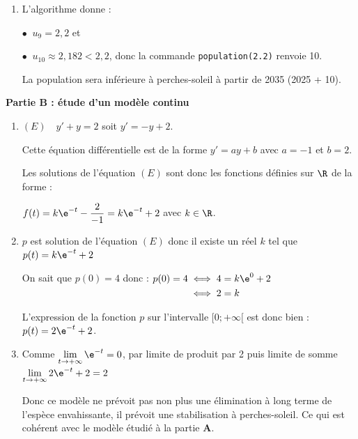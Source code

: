 \begin{enumerate}
\begin{enumerate}
Pour que la boucle \texttt{while} s'arrête dès que $u_n < s$, il faut qu'elle continue tant que cette condition n'est pas réalisée, c'est-à-dire tant que \texttt{u} contient une valeur qui n'est pas strictement inférieure à $s$.

Et tant que c'est le cas, les deux instructions à répéter sont : de remplacer la valeur stockée dans \texttt{u} par la valeur suivante, en appliquant la relation de récurrence, et donc d'augmenter de 1 la valeur de l'indice stocké dans \texttt{n}, pour garder la correspondance.
		\item L'algorithme donne :

$\bullet~$ $u_9 = 2,2$ et 

$\bullet~$ $u_{10} \approx 2,182 <  2,2$, donc la commande \texttt{population(2.2)} renvoie 10.

La population sera inférieure à  perches-soleil à partir de 2035 (2025 + 10).
	\end{enumerate}
	\end{enumerate}

	\textbf{Partie B : étude d'un modèle continu}
	
	\begin{enumerate}
		\item $(E) \quad y'+y=2$ \quad soit \quad $y'=-y+2$.

		Cette équation différentielle est de la forme \quad $y'=ay+b$ \quad avec $a=-1$ et $b=2$.

		Les solutions de l'équation $(E)$ sont donc les fonctions définies sur $\R$ de la forme :

		$f(t) = k \e^{-t} - \dfrac{2}{-1}= k\e^{-t} +2$ \quad avec $k \in \R$.


		\item $p$ est solution de l'équation $(E)$ donc il existe un réel $k$ tel que $p(t) = k\e^{-t} +2$

		On sait que $p(0)=4$ donc : \quad $\begin{aligned}[t]
			p(0) = 4 &\iff 4= k \e^{0} +2 \\
		&\iff 2 = k
		\end{aligned}$

	L'expression de la fonction $p$ sur l'intervalle $[0;+\infty[$ est donc bien : \quad $p(t)=2 \e^{-t}+2$.
		\item Comme $\lim\limits_{t\to +\infty} \e^{-t} = 0$, par limite de produit par 2 puis limite de somme $\lim\limits_{t\to +\infty} 2 \e^{-t} + 2 = 2$

Donc ce modèle ne prévoit pas non plus une élimination à long terme de l'espèce envahissante, il prévoit une stabilisation à  perches-soleil. Ce qui est cohérent avec le modèle étudié à la partie \textbf{A}.
	\end{enumerate}

